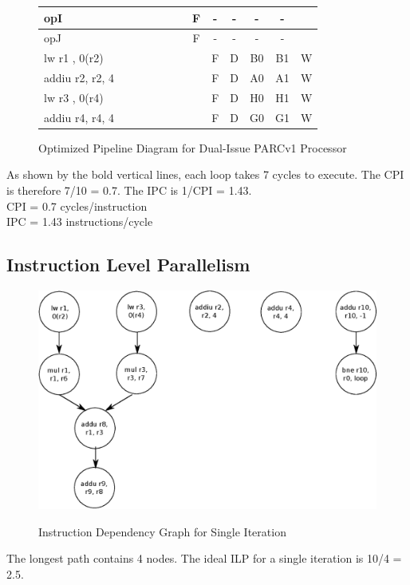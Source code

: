 \documentclass[10pt]{article}
\begin{document}
\begin{figure}[H]
{\begin{tabular}{|l|c|c|c|c!{\vrule width 1.5pt}c|c|c|c|c|c|c!{\vrule width 1.5pt}c|}
opI               &    &    &    &    &    &    & F  & -  & -  & -  & -  &    \\ \hline
opJ               &    &    &    &    &    &    & F  & -  & -  & -  & -  &    \\ \hline
lw r1 , 0(r2)     &    &    &    &    &    &    &    & F  & D  & B0 & B1 & W  \\ \hline
addiu r2, r2, 4   &    &    &    &    &    &    &    & F  & D  & A0 & A1 & W  \\ \hline
lw r3 , 0(r4)     &    &    &    &    &    &    &    & F  & D  & H0 & H1 & W  \\ \hline
addiu r4, r4, 4   &    &    &    &    &    &    &    & F  & D  & G0 & G1 & W  \\ \hline
\end{tabular}
}
\caption{Optimized Pipeline Diagram for Dual-Issue PARCv1 Processor}
\end{figure}

As shown by the bold vertical lines, each loop takes 7 cycles to execute. The CPI is therefore 7/10 = 0.7. The IPC is 1/CPI = 1.43.\\
CPI = 0.7 cycles/instruction\\
IPC = 1.43 instructions/cycle

\subsection{Instruction Level Parallelism}

\begin{figure}[H]
\begin{center}
\includegraphics[scale=0.5]{singleiteri.eps}
\label{default}
\end{center}
\caption{Instruction Dependency Graph for Single Iteration}
\end{figure}
The longest path contains 4 nodes.
The ideal ILP for a single iteration is 10/4 = 2.5.
\end{document}
